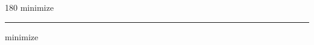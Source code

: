 
\begin{frame}
\begin{center}
\begin{turn}{180}
{\fontsize{2.5cm}{1em}\selectfont minimize}
\end{turn}
\vspace{1em}\par  
\hrule
\vspace{1em}\par  
{\fontsize{2.5cm}{1em}\selectfont minimize}
\end{center}
\end{frame}

